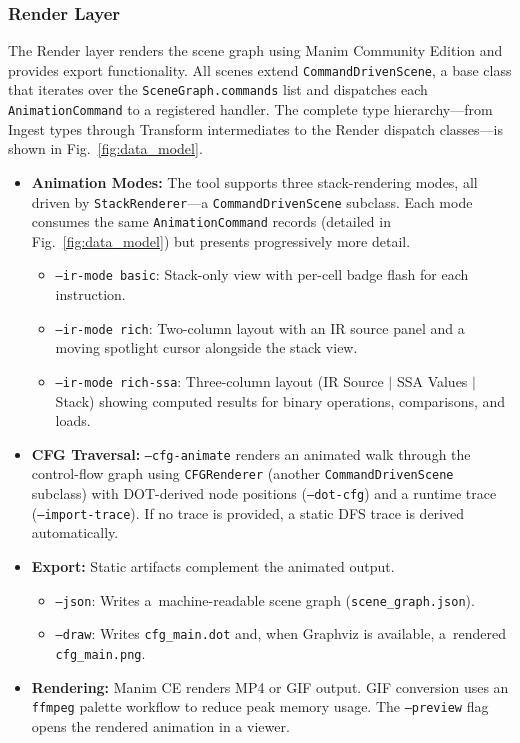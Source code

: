 \subsubsection{Render Layer}
The Render layer renders the scene graph using Manim Community Edition\cite{manimce} and provides export functionality. All scenes extend \texttt{CommandDrivenScene}, a base class that iterates over the \texttt{SceneGraph.commands} list and dispatches each \texttt{AnimationCommand} to a registered handler. The complete type hierarchy---from Ingest types through Transform intermediates to the Render dispatch classes---is shown in Fig.~\ref{fig:data_model}.

\begin{itemize}
    \item \textbf{Animation Modes:} The tool supports three stack-rendering modes, all driven by \texttt{StackRenderer}---a \texttt{CommandDrivenScene} subclass. Each mode consumes the same \texttt{AnimationCommand} records (detailed in Fig.~\ref{fig:data_model}) but presents progressively more detail.
    \begin{itemize}
        \item \texttt{--ir-mode basic}: Stack-only view with per-cell badge flash for each instruction.
        \item \texttt{--ir-mode rich}: Two-column layout with an IR source panel and a moving spotlight cursor alongside the stack view.
        \item \texttt{--ir-mode rich-ssa}: Three-column layout (IR Source $\mid$ SSA Values $\mid$ Stack) showing computed results for binary operations, comparisons, and loads.
    \end{itemize}

    \item \textbf{CFG Traversal:} \texttt{--cfg-animate} renders an animated walk through the control-flow graph using \texttt{CFGRenderer} (another \texttt{CommandDrivenScene} subclass) with DOT-derived node positions (\texttt{--dot-cfg}) and a runtime trace (\texttt{--import-trace}). If no trace is provided, a static DFS trace is derived automatically.

    \item \textbf{Export:} Static artifacts complement the animated output.
    \begin{itemize}
        \item \texttt{--json}: Writes a~machine-readable scene graph (\texttt{scene\_graph.json}).
        \item \texttt{--draw}: Writes \texttt{cfg\_main.dot} and, when Graphviz is available, a~rendered \texttt{cfg\_main.png}.
    \end{itemize}

    \item \textbf{Rendering:} Manim CE renders MP4 or GIF output. GIF conversion uses an \texttt{ffmpeg} palette workflow to reduce peak memory usage. The \texttt{--preview} flag opens the rendered animation in a viewer.
\end{itemize}
